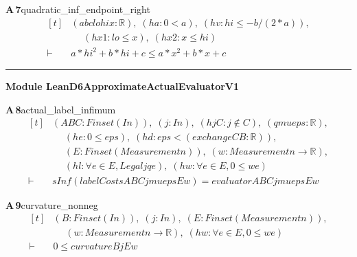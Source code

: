 \documentclass[conference]{IEEEtran}
\theoremstyle{definition}
\newcommand{\lean}[1]{\textsf{\footnotesize #1}}
\begin{document}
\noindent\textbf{A\,7}\quad\lean{quadratic\_inf\_endpoint\_right}
{\footnotesize\[ \begin{aligned}[t]
&(\mathit{a} \mathit{b} \mathit{c} \mathit{lo} \mathit{hi} \mathit{x} : \mathbb{R} ),\; (\mathit{ha} : 0 < \mathit{a}),\; (\mathit{hv} : \mathit{hi} \leq -\mathit{b} / (2 * \mathit{a})),\\
&\quad \; (\mathit{hx1} : \mathit{lo} \leq \mathit{x}),\; (\mathit{hx2} : \mathit{x} \leq \mathit{hi})\\
\vdash\;&\mathit{a} * \mathit{hi} ^{2} + \mathit{b} * \mathit{hi} + \mathit{c} \leq \mathit{a} * \mathit{x} ^{2} + \mathit{b} * \mathit{x} + \mathit{c}
\end{aligned} \]}

\vspace{4pt}\noindent\rule{\columnwidth}{0.4pt}\par\vspace{2pt}
\noindent\textbf{Module \lean{LeanD6ApproximateActualEvaluatorV1}}\par\vspace{3pt}

\noindent\textbf{A\,8}\quad\lean{actual\_label\_infimum}
{\footnotesize\[ \begin{aligned}[t]
&(\mathit{A} \mathit{B} \mathit{C} : \mathit{Finset} (\mathit{I} \mathit{n})),\; (\mathit{j} : \mathit{I} \mathit{n}),\; (\mathit{hjC} : \mathit{j} \notin \mathit{C}),\; (\mathit{q} \mathit{mu} \mathit{eps} : \mathbb{R} ),\\
&\quad \; (\mathit{he} : 0 \leq \mathit{eps}),\; (\mathit{hd} : \mathit{eps} < (\mathit{exchange} \mathit{C} \mathit{B} : \mathbb{R} )),\\
&\quad \; (\mathit{E} : \mathit{Finset} (\mathit{Measurement} \mathit{n})),\; (\mathit{w} : \mathit{Measurement} \mathit{n} \to \mathbb{R} ),\\
&\quad \; (\mathit{hl} : \forall \mathit{e} \in \mathit{E},\mathit{Legal} \mathit{j} \mathit{q} \mathit{e}),\; (\mathit{hw} : \forall \mathit{e} \in \mathit{E},0 \leq \mathit{w} \mathit{e})\\
\vdash\;&\mathit{sInf} (\mathit{labelCosts} \mathit{A} \mathit{B} \mathit{C} \mathit{j} \mathit{mu} \mathit{eps} \mathit{E} \mathit{w})=\mathit{evaluator} \mathit{A} \mathit{B} \mathit{C} \mathit{j} \mathit{mu} \mathit{eps} \mathit{E} \mathit{w}
\end{aligned} \]}

\noindent\textbf{A\,9}\quad\lean{curvature\_nonneg}
{\footnotesize\[ \begin{aligned}[t]
&(\mathit{B} : \mathit{Finset} (\mathit{I} \mathit{n})),\; (\mathit{j} : \mathit{I} \mathit{n}),\; (\mathit{E} : \mathit{Finset} (\mathit{Measurement} \mathit{n})),\\
&\quad \; (\mathit{w} : \mathit{Measurement} \mathit{n} \to \mathbb{R} ),\; (\mathit{hw} : \forall \mathit{e} \in \mathit{E},0 \leq \mathit{w} \mathit{e})\\
\vdash\;&0 \leq \mathit{curvature} \mathit{B} \mathit{j} \mathit{E} \mathit{w}
\end{aligned} \]}
\end{document}
